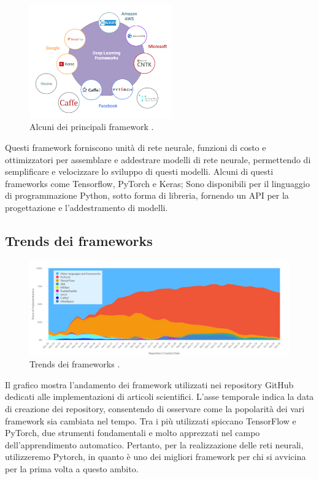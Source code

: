\begin{figure}[H]
    \centering
    \includegraphics[width=0.55\textwidth]{Immagini/Generiche/Deep Learning Frameworks.png}
    \caption{Alcuni dei principali framework \cite{Framework_Devopedia}.}
\end{figure}

Questi framework forniscono unità di rete neurale, funzioni di costo e 
ottimizzatori per assemblare e addestrare modelli di rete neurale, permettendo di
semplificare e velocizzare lo sviluppo di questi modelli.
Alcuni di questi frameworks come Tensorflow, PyTorch e Keras; Sono disponibili
per il linguaggio di programmazione Python, sotto forma di libreria, fornendo un
API per la progettazione e l’addestramento di modelli.  


\subsection{Trends dei frameworks}

\begin{figure}[H]
    \centering
    \includegraphics[width=1.0\textwidth]{Immagini/Grafici/graficoFrameWork.png}
    \caption{Trends dei frameworks \cite{Framework_PapersWithCode}.}
\end{figure}

Il grafico mostra l'andamento dei framework utilizzati nei repository GitHub 
dedicati alle implementazioni di articoli scientifici.
L'asse temporale indica la data di creazione dei repository, consentendo di 
osservare come la popolarità dei vari framework sia cambiata nel tempo.
Tra i più utilizzati spiccano TensorFlow e PyTorch, due strumenti fondamentali e 
molto apprezzati nel campo dell'apprendimento automatico.
Pertanto, per la realizzazione delle reti neurali, utilizzeremo Pytorch, in quanto è uno 
dei migliori framework per chi si avvicina per la prima volta a questo ambito. 




